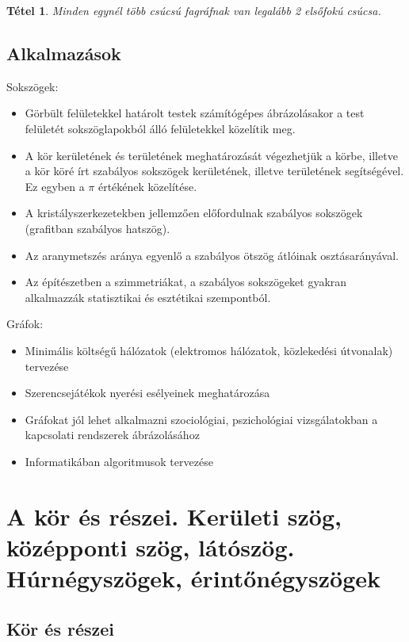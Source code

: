 \documentclass[12pt,a4paper]{article}
\newtheorem{theorem}{Tétel} [section]
\begin{document}
\begin{theorem}
Minden egynél több csúcsú fagráfnak van legalább 2 elsőfokú csúcsa.
\end{theorem}
\newpage

\subsection{Alkalmazások}
Sokszögek:
\begin{itemize}
\item  Görbült felületekkel határolt testek számítógépes ábrázolásakor a test felületét sokszöglapokból álló felületekkel közelítik meg.
\item A kör kerületének és területének meghatározását végezhetjük a körbe, illetve a kör köré írt szabályos sokszögek kerületének, illetve területének segítségével. Ez egyben a $\pi$ értékének közelítése.
\item A kristályszerkezetekben jellemzően előfordulnak szabályos sokszögek (grafitban szabályos hatszög).
\item Az aranymetszés aránya egyenlő a szabályos ötszög átlóinak osztásarányával.
\item Az építészetben a szimmetriákat, a szabályos sokszögeket gyakran alkalmazzák statisztikai és esztétikai szempontból.
\end{itemize}
Gráfok:
\begin{itemize}
\item Minimális költségű hálózatok (elektromos hálózatok, közlekedési útvonalak) tervezése
\item Szerencsejátékok nyerési esélyeinek meghatározása
\item Gráfokat jól lehet alkalmazni szociológiai, pszichológiai vizsgálatokban a kapcsolati rendszerek ábrázolásához
\item Informatikában algoritmusok tervezése
\end{itemize}

\newpage





\section{A kör és részei. Kerületi szög, középponti szög, látószög. Húrnégyszögek, érintőnégyszögek}

\subsection{Kör és részei}
\end{document}

